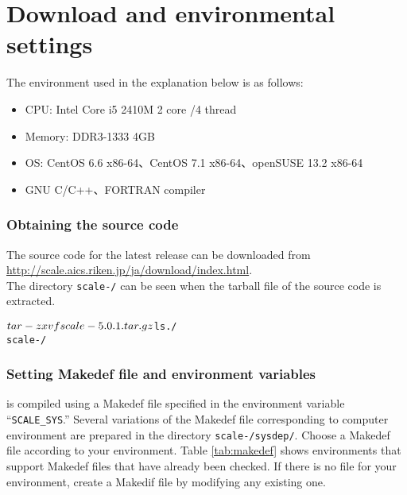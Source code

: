 \section{Download and environmental settings} \label{sec:scale_compile}

The environment used in the explanation below is as follows:
\begin{itemize}
\item CPU: Intel Core i5 2410M 2 core /4 thread
\item Memory: DDR3-1333 4GB
\item OS: CentOS 6.6 x86-64、CentOS 7.1 x86-64、openSUSE 13.2 x86-64
\item GNU C/C++、FORTRAN compiler %
\end{itemize}

\subsubsection{Obtaining the source code} %
The source code for the latest release can be downloaded
from \url{http://scale.aics.riken.jp/ja/download/index.html}.\\
The directory \texttt{scale-{\version}/} can be seen when the tarball file of the source code is extracted.
\begin{alltt}
 $ tar -zxvf scale-{\version}.tar.gz
 $ ls ./
    scale-{\version}/
\end{alltt}

\subsubsection{Setting Makedef file and environment variables} \label{subsec:environment}

\scalelib is compiled using a Makedef file specified in the environment variable ``\verb|SCALE_SYS|.''  Several variations of the Makedef file corresponding to computer environment are prepared in the directory \texttt{scale-{\version}/sysdep/}.  Choose a Makedef file according to your environment. Table \ref{tab:makedef} shows  environments that support Makedef files that have already been checked. If there is no file for your environment,  create a Makedif file by modifying any existing one.


